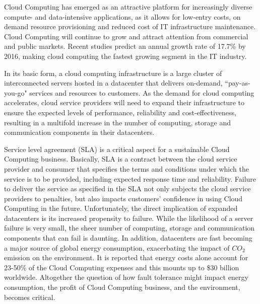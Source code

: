 Cloud Computing has emerged as an attractive platform for increasingly diverse compute- and data-intensive applications, as it allows for low-entry costs, on demand resource provisioning and reduced cost of IT infrastructure maintenance. Cloud Computing will continue to grow and attract attention from commercial and public markets. Recent studies predict an annual growth rate of 17.7\% by 2016, making cloud computing the fastest growing segment in the IT industry.


In its basic form, a cloud computing infrastructure is a large cluster
of interconnected servers hosted in a datacenter that delivers on-demand, ``pay-as-you-go" services and resources to customers. As the demand for cloud computing
accelerates, cloud service providers will 
need to expand their infrastructure to ensure the expected
levels of performance, reliability and cost-effectiveness, resulting
in a multifold increase in the number of computing, storage and
communication components in their datacenters. 



Service level agreement (SLA) is a critical aspect for a sustainable Cloud Computing business. Basically, SLA is a contract between the cloud service provider and consumer that specifies the
terms and conditions under which the service is to be provided,
including expected response time and reliability. Failure to deliver the service as specified in the SLA not only subjects the cloud service providers to penalties, but also impacts customers' confidence in using Cloud Computing in the future. 
Unfortunately, the direct implication of expanded datacenters is its increased propensity to
failure. While the likelihood of a server failure is very small, the
sheer number of computing, storage and communication components that
can fail is daunting. %
In addition, datacenters are fast becoming a major source of global energy consumption, exacerbating the impact of $CO_2$ emission on the environment. It is reported that energy costs alone account
for 23-50\% of the Cloud Computing expenses and this mounts up to \$30 billion worldwide. Altogether the question of how fault tolerance might impact energy consumption, the profit of Cloud Computing business, and the environment, becomes critical.

